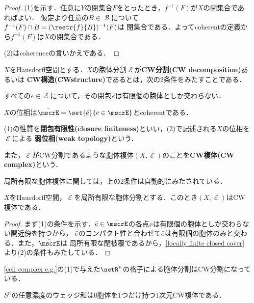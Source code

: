 \documentclass[uplatex]{jsarticle}
\newcommand{\setinverse}[2]{#1 ^{-1}(#2)}
\begin{document}
\begin{proof}
  (1)を示す．任意に$Y$の閉集合$F$をとったとき，$\setinverse{f}{F}$が$X$の閉集合であればよい．
  仮定より任意の$B\in \mscrB$について$\setinverse{f}{F}\cap B=\setinverse{(\restr{f}{B})}{F}$は
  閉集合である．よってcoherentの定義から$\setinverse{f}{F}$は$X$の閉集合である．

  (2)はcoherenceの言いかえである．
\end{proof}

\begin{definition}
  $X$をHausdorff空間とする．$X$の胞体分割$\mscrE$が\textbf{CW分割(CW decomposition)}あるいは
  \textbf{CW構造(CWstructure)}であるとは，次の2条件をみたすことである．
  \begin{enumarabicp}
    \item
    すべての$e\in \mscrE$について，その閉包$\Bar{e}$は有限個の胞体としか交わらない．
    \item
    $X$の位相は$\Bar{\mscrE}=\set{\Bar{e}}{e\in \mscrE}$とcoherentである．
  \end{enumarabicp}
  (1)の性質を\textbf{閉包有限性(closure finiteness)}といい，(2)で記述される$X$の位相を$\mscrE$による
  \textbf{弱位相(weak topology)}という．

  また，$\mscrE$がCW分割であるような胞体複体$(X,\mscrE)$のことを\textbf{CW複体(CW complex)}という．
\end{definition}

局所有限な胞体複体に関しては，上の2条件は自動的にみたされている．

\begin{proposition}
  $X$をHausdorff空間，$\mscrE$を局所有限な胞体分割とする．このとき$(X,\mscrE)$はCW複体である．
\end{proposition}

\begin{proof}
  まず(1)の条件を示す．$\Bar{e}\in \Bar{\mscrE}$の各点$x$は有限個の胞体としか交わらない開近傍を持つから，
  $\Bar{e}$のコンパクト性と合わせて$\Bar{e}$は有限個の胞体のみと交わる．また，$\Bar{\mscrE}$は
  局所有限な閉被覆であるから，\cref{locally finite closed cover}より(2)の条件もみたしている．
\end{proof}

\begin{example}
  \begin{enumarabicp}
    \item
    \cref{cell complex e.g.}の(1)で与えた$\setR^n$の格子による胞体分割はCW分割になっている．
    \item
    $S^n$の任意濃度のウェッジ和は0胞体を1つだけ持つ1次元CW複体である．
  \end{enumarabicp}
\end{example}
\end{document}
